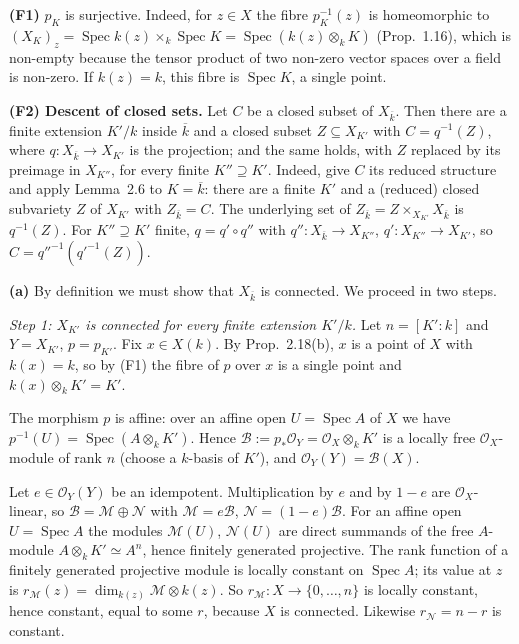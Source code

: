 \documentclass[11pt]{article}
\begin{document}
\textbf{(F1)} $p_K$ is surjective. Indeed, for $z\in X$ the fibre $p_K^{-1}(z)$ is homeomorphic to $(X_K)_z=\operatorname{Spec}k(z)\times_k\operatorname{Spec}K=\operatorname{Spec}(k(z)\otimes_kK)$ (Prop.~1.16), which is non-empty because the tensor product of two non-zero vector spaces over a field is non-zero. If $k(z)=k$, this fibre is $\operatorname{Spec}K$, a single point.

\textbf{(F2) Descent of closed sets.} Let $C$ be a closed subset of $X_{\overline k}$. Then there are a finite extension $K'/k$ inside $\overline k$ and a closed subset $Z\subseteq X_{K'}$ with $C=q^{-1}(Z)$, where $q:X_{\overline k}\to X_{K'}$ is the projection; and the same holds, with $Z$ replaced by its preimage in $X_{K''}$, for every finite $K''\supseteq K'$. Indeed, give $C$ its reduced structure and apply Lemma~2.6 to $K=\overline k$: there are a finite $K'$ and a (reduced) closed subvariety $Z$ of $X_{K'}$ with $Z_{\overline k}=C$. The underlying set of $Z_{\overline k}=Z\times_{X_{K'}}X_{\overline k}$ is $q^{-1}(Z)$. For $K''\supseteq K'$ finite, $q=q'\circ q''$ with $q'':X_{\overline k}\to X_{K''}$, $q':X_{K''}\to X_{K'}$, so $C=q''^{-1}(q'^{-1}(Z))$.

\textbf{(a)} By definition we must show that $X_{\overline k}$ is connected. We proceed in two steps.

\emph{Step 1: $X_{K'}$ is connected for every finite extension $K'/k$.} Let $n=[K':k]$ and $Y=X_{K'}$, $p=p_{K'}$. Fix $x\in X(k)$. By Prop.~2.18(b), $x$ is a point of $X$ with $k(x)=k$, so by (F1) the fibre of $p$ over $x$ is a single point and $k(x)\otimes_kK'=K'$.

The morphism $p$ is affine: over an affine open $U=\operatorname{Spec}A$ of $X$ we have $p^{-1}(U)=\operatorname{Spec}(A\otimes_kK')$. Hence $\mathcal B:=p_*\mathcal O_Y=\mathcal O_X\otimes_kK'$ is a locally free $\mathcal O_X$-module of rank $n$ (choose a $k$-basis of $K'$), and $\mathcal O_Y(Y)=\mathcal B(X)$.

Let $e\in\mathcal O_Y(Y)$ be an idempotent. Multiplication by $e$ and by $1-e$ are $\mathcal O_X$-linear, so $\mathcal B=\mathcal M\oplus\mathcal N$ with $\mathcal M=e\mathcal B$, $\mathcal N=(1-e)\mathcal B$. For an affine open $U=\operatorname{Spec}A$ the modules $\mathcal M(U)$, $\mathcal N(U)$ are direct summands of the free $A$-module $A\otimes_kK'\simeq A^n$, hence finitely generated projective. The rank function of a finitely generated projective module is locally constant on $\operatorname{Spec}A$; its value at $z$ is $r_{\mathcal M}(z)=\dim_{k(z)}\mathcal M\otimes k(z)$. So $r_{\mathcal M}:X\to\{0,\dots,n\}$ is locally constant, hence constant, equal to some $r$, because $X$ is connected. Likewise $r_{\mathcal N}=n-r$ is constant.
\end{document}
